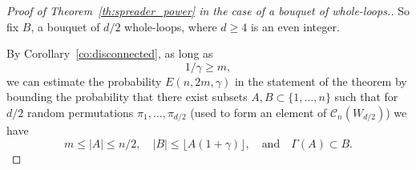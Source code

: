 \documentclass{memo-l}
\theoremstyle{plain}
\theoremstyle{definition}
\numberwithin{section}{chapter}
\numberwithin{equation}{chapter}
\theoremstyle{plain}
\theoremstyle{definition}
\newcommand\cC{\mathcal{C}}
\begin{document}
\begin{proof}[Proof of Theorem~\ref{th:spreader_power} in the case of
a bouquet of whole-loops.]

So fix $B$, a bouquet of $d/2$ whole-loops, where $d\ge 4$ is an
even integer.


By Corollary~\ref{co:disconnected},
as long as 
$$
1/\gamma\ge m,
$$
we can estimate the probability $E(n,2m,\gamma)$ in the statement of the
theorem by bounding the probability that there exist subsets
$A,B\subset\{1,\ldots,n\}$ such that for $d/2$ random permutations
$\pi_1,\ldots,\pi_{d/2}$ (used to form an element of 
$\cC_n(W_{d/2})$) we have
$$
m\le |A|\le n/2,\quad |B|\le \lfloor A(1+\gamma) \rfloor ,\quad
\mbox{and}\quad \Gamma(A)\subset B.
$$


\end{proof}
\end{document}
